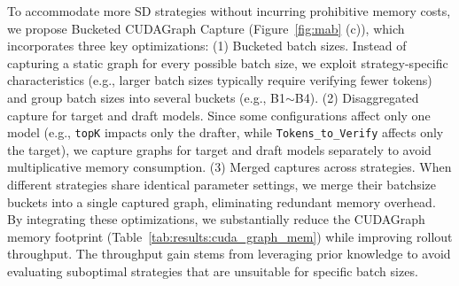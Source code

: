 \documentclass[sigplan,screen]{acmart}
\begin{document}
To accommodate more SD strategies without incurring prohibitive memory costs, we propose Bucketed CUDAGraph Capture (Figure~\ref{fig:mab} (c)), which incorporates three key optimizations: (1) Bucketed batch sizes. Instead of capturing a static graph for every possible batch size, we exploit strategy-specific characteristics (e.g., larger batch sizes typically require verifying fewer tokens) and group batch sizes into several buckets (e.g., B1$\sim$B4). 
(2) Disaggregated capture for target and draft models. Since some configurations affect only one model (e.g., \texttt{topK} impacts only the drafter, while \texttt{Tokens\_to\_Verify} affects only the target), we capture graphs for target and draft models separately to avoid multiplicative memory consumption. (3) Merged captures across strategies. When different strategies share identical parameter settings, we merge their batchsize buckets into a single captured graph, eliminating redundant memory overhead.
By integrating these optimizations, we substantially reduce the CUDAGraph memory footprint (Table~\ref{tab:results:cuda_graph_mem}) while improving rollout throughput. The throughput gain stems from leveraging prior knowledge to avoid evaluating suboptimal strategies that are unsuitable for specific batch sizes.
\end{document}
